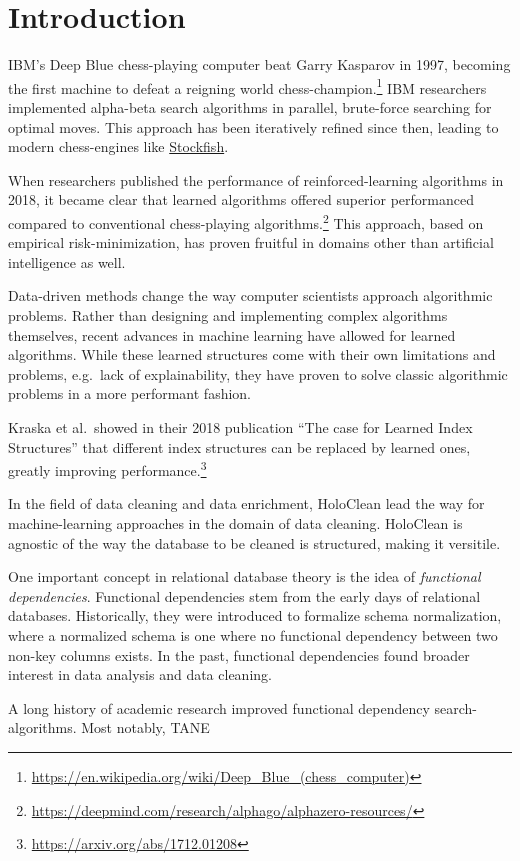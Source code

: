 \section{Introduction}
IBM's Deep Blue chess-playing computer beat Garry Kasparov in 1997, becoming the first machine to defeat a reigning world chess-champion.\footnote{\url{https://en.wikipedia.org/wiki/Deep_Blue_(chess_computer)}}
IBM researchers implemented alpha-beta search algorithms in parallel, brute-force searching for optimal moves.
This approach has been iteratively refined since then, leading to modern chess-engines like \href{https://github.com/official-stockfish/Stockfish}{Stockfish}.

When researchers published the performance of reinforced-learning algorithms in 2018, it became clear that learned algorithms offered superior performanced compared to conventional chess-playing algorithms.\footnote{\url{https://deepmind.com/research/alphago/alphazero-resources/}}
This approach, based on empirical risk-minimization, has proven fruitful in domains other than artificial intelligence as well.

Data-driven methods change the way computer scientists approach algorithmic problems.
Rather than designing and implementing complex algorithms themselves, recent advances in machine learning have allowed for learned algorithms.
While these learned structures come with their own limitations and problems, e.g.\ lack of explainability, they have proven to solve classic algorithmic problems in a more performant fashion.

Kraska et al.\ showed in their 2018 publication ``The case for Learned Index Structures'' that different index structures can be replaced by learned ones, greatly improving performance.\footnote{\url{https://arxiv.org/abs/1712.01208}}

In the field of data cleaning and data enrichment, HoloClean lead the way for machine-learning approaches in the domain of data cleaning.
HoloClean is agnostic of the way the database to be cleaned is structured, making it versitile.

One important concept in relational database theory is the idea of \emph{functional dependencies}.
Functional dependencies stem from the early days of relational databases.
Historically, they were introduced to formalize schema normalization, where a normalized schema is one where no functional dependency between two non-key columns exists.
In the past, functional dependencies found broader interest in data analysis and data cleaning.

A long history of academic research improved functional dependency search-algorithms.
Most notably, TANE

